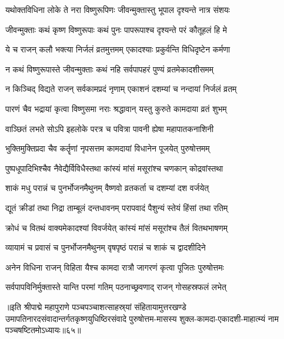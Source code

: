 \twolineshloka
{यथोक्तविधिना लोके ते नरा विष्णुरूपिणः }
{जीवन्मुक्तास्तु भूपाल दृश्यन्ते नात्र संशयः}%


\twolineshloka
{जीवन्मुक्ताः कथं कृष्ण विष्णुरूपाः कथं पुनः}
{पापरूपाश्च दृश्यन्ते परं कौतूहलं हि मे}%


\twolineshloka
{ये च राजन् कलौ भक्त्या निर्जलं व्रतमुत्तमम्}
{एकादश्याः प्रकुर्वन्ति विधिदृष्टेन कर्मणा}%

\twolineshloka
{न कथं विष्णुरूपास्ते जीवन्मुक्ताः कथं नहि}
{सर्वपापहरं पुण्यं व्रतमेकादशीसमम्}%

\twolineshloka
{न किञ्चिद् विद्यते राजन् सर्वकामप्रदं नृणाम्}
{एकाशनं दशम्यां च नन्दायां निर्जलं व्रतम्}%

\twolineshloka
{पारणं चैव भद्रायां कृत्वा विष्णुसमा नराः}
{श्रद्धावान् यस्तु कुरुते कामदाया व्रतं शुभम्}%

\twolineshloka
{वाञ्छितं लभते सोऽपि इहलोके परत्र च}
{पवित्रा पावनी ह्येषा महापातकनाशिनी}%

\twolineshloka
{भुक्तिमुक्तिप्रदा चैव कर्तॄणां नृपसत्तम}
{कामदायां विधानेन पूजयेत् पुरुषोत्तमम्}%

\twolineshloka
{पुष्पधूपादिभिश्चैव नैवेद्यैर्विविधैस्तथा}
{कांस्यं मांसं मसूरांश्च चणकान् कोद्रवांस्तथा}%

\twolineshloka
{शाकं मधु परान्नं च पुनर्भोजनमैथुनम्}
{वैष्णवो व्रतकर्ता च दशम्यां दश वर्जयेत्}%

\twolineshloka
{द्यूतं क्रीडां तथा निद्रा ताम्बूलं दन्तधावनम्}
{परापवादं पैशुन्यं स्तेयं हिंसां तथा रतिम्}%

\twolineshloka
{क्रोधं च वितथं वाक्यमेकादश्यां विवर्जयेत्}
{कांस्यं मांसं मसूरांश्च तैलं वितथभाषणम्}%

\twolineshloka
{व्यायामं च प्रवासं च पुनर्भोजनमैथुनम्}
{वृषपृष्ठं परान्नं च शाकं च द्वादशीदिने}%

\twolineshloka
{अनेन विधिना राजन् विहिता यैश्च कामदा}
{रात्रौ जागरणं कृत्वा पूजितः पुरुषोत्तमः}%

\twolineshloka
{सर्वपापविनिर्मुक्तास्ते यान्ति परमां गतिम्}
{पठनाच्छ्रवणाद् राजन् गोसहस्रफलं लभेत्}%

॥इति श्रीपाद्मे महापुराणे पञ्चपञ्चाशत्साहस्र्यां संहितायामुत्तरखण्डे उमापतिनारदसंवादान्तर्गतकृष्णयुधिष्ठिरसंवादे पुरुषोत्तम-मासस्य शुक्ल-कामदा-एकादशी-माहात्म्यं नाम पञ्चषष्टितमोऽध्यायः॥६५॥

\genMangalaShloka

